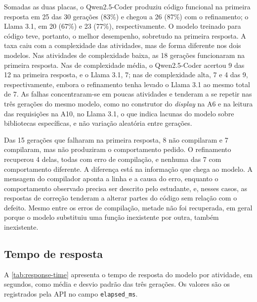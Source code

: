 Somadas as duas placas, o Qwen2.5-Coder produziu código funcional na primeira resposta em 25 das 30 gerações (83\%) e chegou a 26 (87\%) com o refinamento; o Llama 3.1, em 20 (67\%) e 23 (77\%), respectivamente. O modelo treinado para código teve, portanto, o melhor desempenho, sobretudo na primeira resposta. A taxa caiu com a complexidade das atividades, mas de forma diferente nos dois modelos. Nas atividades de complexidade baixa, as 18 gerações funcionaram na primeira resposta. Nas de complexidade média, o Qwen2.5-Coder acertou 9 das 12 na primeira resposta, e o Llama 3.1, 7; nas de complexidade alta, 7 e 4 das 9, respectivamente, embora o refinamento tenha levado o Llama 3.1 ao mesmo total de 7. As falhas concentraram-se em poucas atividades e tenderam a se repetir nas três gerações do mesmo modelo, como no construtor do \textit{display} na A6 e na leitura das requisições na A10, no Llama 3.1, o que indica lacunas do modelo sobre bibliotecas específicas, e não variação aleatória entre gerações.

Das 15 gerações que falharam na primeira resposta, 8 não compilaram e 7 compilaram, mas não produziram o comportamento pedido. O refinamento recuperou 4 delas, todas com erro de compilação, e nenhuma das 7 com comportamento diferente. A diferença está na informação que chega ao modelo. A mensagem do compilador aponta a linha e a causa do erro, enquanto o comportamento observado precisa ser descrito pelo estudante, e, nesses casos, as respostas de correção tenderam a alterar partes do código sem relação com o defeito. Mesmo entre os erros de compilação, metade não foi recuperada, em geral porque o modelo substituiu uma função inexistente por outra, também inexistente.

\subsection{Tempo de resposta}
\label{subsec:results-time}

A \autoref{tab:response-time} apresenta o tempo de resposta do modelo por atividade, em segundos, como média e desvio padrão das três gerações. Os valores são os registrados pela API no campo \texttt{elapsed\_ms}.

